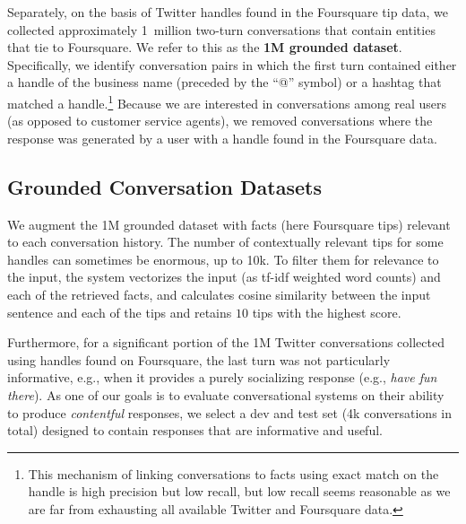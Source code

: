 \documentclass[letterpaper]{article}
\begin{document}
Separately, on the basis of Twitter handles found in the Foursquare tip data, we collected approximately 1~million two-turn conversations that contain entities that tie to Foursquare. We refer to this as
the {\bf 1M grounded dataset}.
Specifically, we identify conversation pairs
in which the first turn contained either a handle of the business name (preceded by the ``@'' symbol) or a hashtag that matched a handle.\footnote{This mechanism of linking conversations to facts using exact match on the handle is high precision but low recall, but low recall seems reasonable as we are far from exhausting all available Twitter and Foursquare data.}
Because we are interested in conversations among real users (as opposed to customer service agents), we removed conversations where the response was generated by a user with a handle found in the Foursquare data.

\subsection{Grounded Conversation Datasets}

We augment the 1M grounded dataset with facts (here Foursquare tips) relevant to each conversation history. The number of contextually relevant tips for some handles can sometimes be enormous, up to 10k. To filter them for relevance to the input, the system vectorizes the input (as tf-idf weighted word counts) and each of the retrieved facts, and calculates cosine similarity between the input sentence and each of the tips and retains $10$ tips with the highest score.

Furthermore, for a significant portion of the 1M Twitter conversations collected using handles found on Foursquare, the last turn was not particularly informative, e.g., when it provides a purely socializing response (e.g., {\it have fun there}).
As one of our goals is to evaluate conversational systems
on their ability to produce {\it contentful} responses, we select
a dev and test set (4k conversations in total) designed to contain
responses that are informative and useful.
\end{document}
